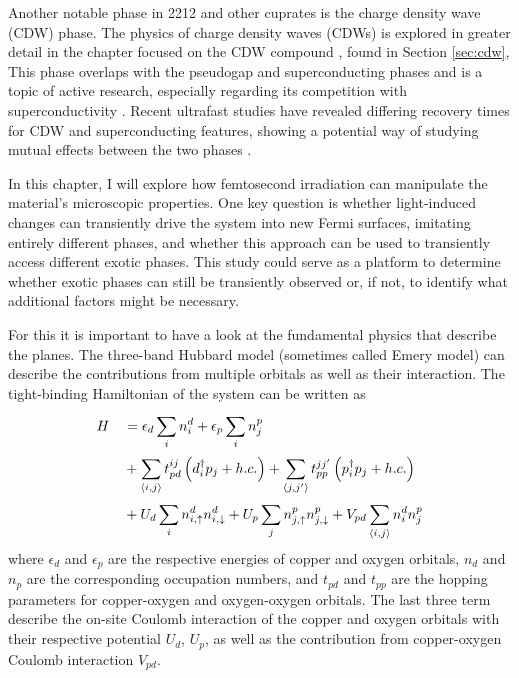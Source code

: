 Another notable phase in 2212 and other cuprates is the charge density wave (CDW) phase.
The physics of charge density waves (CDWs) is explored in greater detail in the chapter focused on the CDW compound , found in Section \ref{sec:cdw},
This phase overlaps with the pseudogap and superconducting phases and is a topic of active research, especially regarding its competition with superconductivity \cite{arpaia_charge_2021}.
Recent ultrafast studies have revealed differing recovery times for CDW and superconducting features, showing a potential way of studying mutual effects between the two phases \cite{wandel_enhanced_2022}.

In this chapter, I will explore how femtosecond irradiation can manipulate the material's microscopic properties.
One key question is whether light-induced changes can transiently drive the system into new Fermi surfaces, imitating entirely different phases, and whether this approach can be used to transiently access different exotic phases.
This study could serve as a platform to determine whether exotic phases can still be transiently observed or, if not, to identify what additional factors might be necessary.

For this it is important to have a look at the fundamental physics that describe the  planes.
The three-band Hubbard model (sometimes called Emery model) can describe the contributions from multiple orbitals as well as their interaction\cite{avella_emery_2013,emery_theory_1987,ogata_tj_2008}.
The tight-binding Hamiltonian of the system can be written as
\begin{equation}
\begin{split}
	H &\quad = \epsilon_d \sum_{i}^{} n_i^d + \epsilon_p \sum_{i}^{} n_j^p \\
	  &\quad + \sum_{\braket{i,j}}^{} t_{pd}^{ij} \left(d_i^\dagger p_j + h.c.\right) + \sum_{\braket{j,j'}}^{} t_{pp}^{jj'} \left(p_i^\dagger p_j + h.c.\right)\\
	  &\quad + U_d \sum_{i}^{} n_{i,\uparrow}^d n_{i,\downarrow}^d + U_p \sum_{j}^{} n_{j,\uparrow}^p n_{j,\downarrow}^p + V_{pd} \sum_{\braket{i,j}}^{} n_i^d n_j^p
\end{split}
\end{equation}
where $\epsilon_d$ and $\epsilon_p$ are the respective energies of copper and oxygen orbitals, $n_d$ and $n_p$ are the corresponding occupation numbers, and $t_{pd}$ and $t_{pp}$ are the hopping parameters for copper-oxygen and oxygen-oxygen orbitals.
The last three term describe the on-site Coulomb interaction of the copper and oxygen orbitals with their respective potential $U_d$, $U_p$, as well as the contribution from copper-oxygen Coulomb interaction $V_{pd}$.

